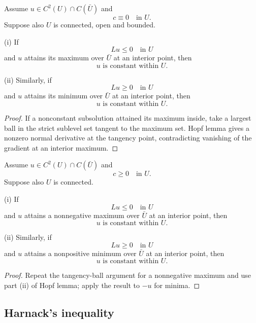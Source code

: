 \begin{theorem}
\label{thm:strong-maximum-principle-c-zero}
Assume $u \in C^2(U) \cap C(\bar U)$ and
$$c \equiv 0 \quad \text{in } U.$$
Suppose also $U$ is connected, open and bounded.

(i) If
$$Lu \leq 0 \quad \text{in } U$$
and $u$ attains its maximum over $\bar U$ at an interior point, then
$$u \text{ is constant within } U.$$

(ii) Similarly, if
$$Lu \geq 0 \quad \text{in } U$$
and $u$ attains its minimum over $\bar U$ at an interior point, then
$$u \text{ is constant within } U.$$
\end{theorem}

\begin{proof}
\sketch If a nonconstant subsolution attained its maximum inside, take a largest ball in the strict sublevel set tangent to the maximum set. Hopf lemma gives a nonzero normal derivative at the tangency point, contradicting vanishing of the gradient at an interior maximum.
\end{proof}

\begin{theorem}
\label{thm:strong-maximum-principle-c-nonneg}
Assume $u \in C^2(U) \cap C(\bar U)$ and
$$c \geq 0 \quad \text{in } U.$$
Suppose also $U$ is connected.

(i) If
$$Lu \leq 0 \quad \text{in } U$$
and $u$ attains a nonnegative maximum over $\bar U$ at an interior point, then
$$u \text{ is constant within } U.$$

(ii) Similarly, if
$$Lu \geq 0 \quad \text{in } U$$
and $u$ attains a nonpositive minimum over $\bar U$ at an interior point, then
$$u \text{ is constant within } U.$$

\end{theorem}

\begin{proof}
\sketch Repeat the tangency-ball argument for a nonnegative maximum and use part (ii) of Hopf lemma; apply the result to $-u$ for minima.
\end{proof}

\subsection{Harnack's inequality}

